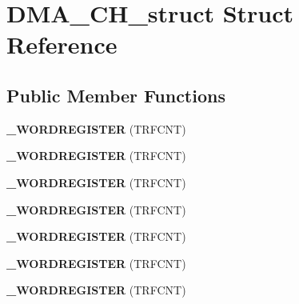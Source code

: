 \hypertarget{struct_d_m_a___c_h__struct}{}\section{D\+M\+A\+\_\+\+C\+H\+\_\+struct Struct Reference}
\label{struct_d_m_a___c_h__struct}
\subsection*{Public Member Functions}
\begin{DoxyCompactItemize}
\item 
{\bfseries \+\_\+\+W\+O\+R\+D\+R\+E\+G\+I\+S\+T\+ER} (T\+R\+F\+C\+NT)\hypertarget{struct_d_m_a___c_h__struct_ad1b73e9872aeeac70108f2102563551e}{}\label{struct_d_m_a___c_h__struct_ad1b73e9872aeeac70108f2102563551e}

\item 
{\bfseries \+\_\+\+W\+O\+R\+D\+R\+E\+G\+I\+S\+T\+ER} (T\+R\+F\+C\+NT)\hypertarget{struct_d_m_a___c_h__struct_ad1b73e9872aeeac70108f2102563551e}{}\label{struct_d_m_a___c_h__struct_ad1b73e9872aeeac70108f2102563551e}

\item 
{\bfseries \+\_\+\+W\+O\+R\+D\+R\+E\+G\+I\+S\+T\+ER} (T\+R\+F\+C\+NT)\hypertarget{struct_d_m_a___c_h__struct_ad1b73e9872aeeac70108f2102563551e}{}\label{struct_d_m_a___c_h__struct_ad1b73e9872aeeac70108f2102563551e}

\item 
{\bfseries \+\_\+\+W\+O\+R\+D\+R\+E\+G\+I\+S\+T\+ER} (T\+R\+F\+C\+NT)\hypertarget{struct_d_m_a___c_h__struct_ad1b73e9872aeeac70108f2102563551e}{}\label{struct_d_m_a___c_h__struct_ad1b73e9872aeeac70108f2102563551e}

\item 
{\bfseries \+\_\+\+W\+O\+R\+D\+R\+E\+G\+I\+S\+T\+ER} (T\+R\+F\+C\+NT)\hypertarget{struct_d_m_a___c_h__struct_ad1b73e9872aeeac70108f2102563551e}{}\label{struct_d_m_a___c_h__struct_ad1b73e9872aeeac70108f2102563551e}

\item 
{\bfseries \+\_\+\+W\+O\+R\+D\+R\+E\+G\+I\+S\+T\+ER} (T\+R\+F\+C\+NT)\hypertarget{struct_d_m_a___c_h__struct_ad1b73e9872aeeac70108f2102563551e}{}\label{struct_d_m_a___c_h__struct_ad1b73e9872aeeac70108f2102563551e}

\item 
{\bfseries \+\_\+\+W\+O\+R\+D\+R\+E\+G\+I\+S\+T\+ER} (T\+R\+F\+C\+NT)\hypertarget{struct_d_m_a___c_h__struct_ad1b73e9872aeeac70108f2102563551e}{}\label{struct_d_m_a___c_h__struct_ad1b73e9872aeeac70108f2102563551e}


\end{DoxyCompactItemize}
